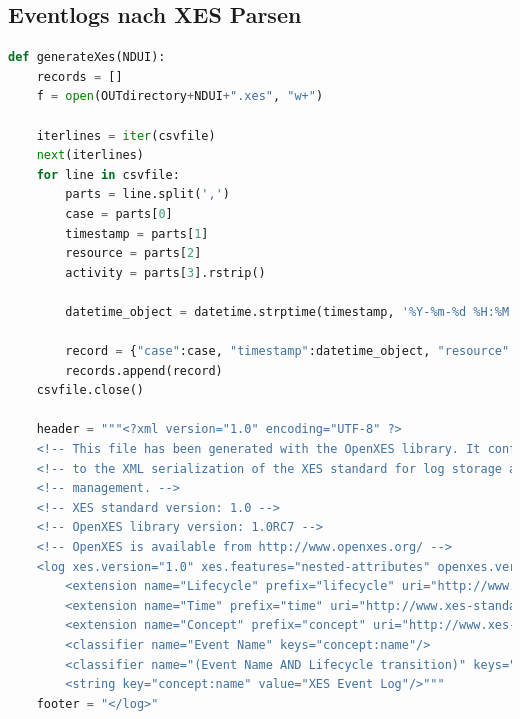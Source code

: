 \subsection{Eventlogs nach XES Parsen}
\begin{lstlisting}[language=Python]
def generateXes(NDUI):
    records = []
    f = open(OUTdirectory+NDUI+".xes", "w+")
  
    iterlines = iter(csvfile)
    next(iterlines)
    for line in csvfile:
        parts = line.split(',')
        case = parts[0]
        timestamp = parts[1]
        resource = parts[2]
        activity = parts[3].rstrip()
    
        datetime_object = datetime.strptime(timestamp, '%Y-%m-%d %H:%M:%S')
    
        record = {"case":case, "timestamp":datetime_object, "resource":resource, "activity":activity}
        records.append(record)
    csvfile.close()
    
    header = """<?xml version="1.0" encoding="UTF-8" ?>
    <!-- This file has been generated with the OpenXES library. It conforms -->
    <!-- to the XML serialization of the XES standard for log storage and -->
    <!-- management. -->
    <!-- XES standard version: 1.0 -->
    <!-- OpenXES library version: 1.0RC7 -->
    <!-- OpenXES is available from http://www.openxes.org/ -->
    <log xes.version="1.0" xes.features="nested-attributes" openxes.version="1.0RC7">
    	<extension name="Lifecycle" prefix="lifecycle" uri="http://www.xes-standard.org/lifecycle.xesext"/>
    	<extension name="Time" prefix="time" uri="http://www.xes-standard.org/time.xesext"/>
    	<extension name="Concept" prefix="concept" uri="http://www.xes-standard.org/concept.xesext"/>
    	<classifier name="Event Name" keys="concept:name"/>
    	<classifier name="(Event Name AND Lifecycle transition)" keys="concept:name lifecycle:transition"/>
    	<string key="concept:name" value="XES Event Log"/>"""
    footer = "</log>"
    

\end{lstlisting}
